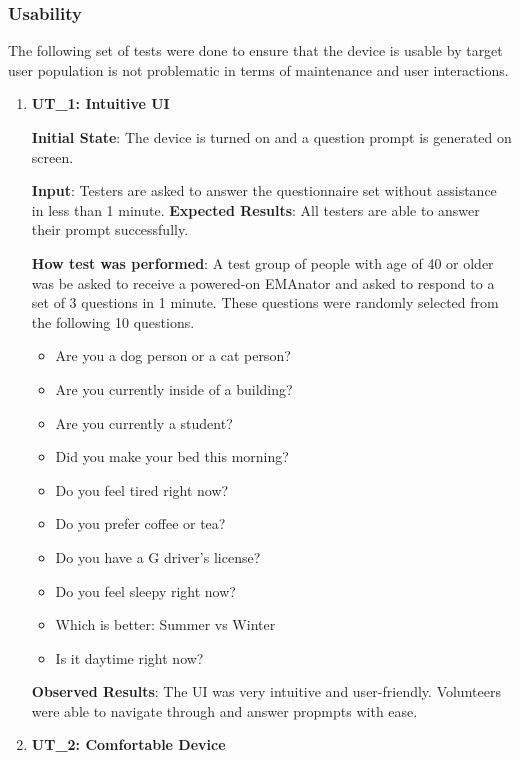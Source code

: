 \documentclass[12pt, titlepage]{article}
\begin{document}
\subsubsection{Usability}
The following set of tests were done to ensure that the device is usable by target user population is not problematic in terms of maintenance and user interactions.
\begin{enumerate}

  \item\textbf{{UT\_1: Intuitive UI\\}}\label{UT1}

  \textbf{Initial State}: The device is turned on and a question prompt is generated on screen.

  \textbf{Input}: Testers are asked to answer the questionnaire set without assistance in less than 1 minute.
  \textbf{Expected Results}: All testers are able to answer their prompt successfully.

  \textbf{How test was performed}: A test group of people with age of 40 or older was be asked to receive a powered-on EMAnator and asked to respond to a set of 3 questions in 1 minute. These questions were randomly selected from the following 10 questions.

  \begin{itemize}
    \item Are you a dog person or a cat person?
    \item Are you currently inside of a building?
    \item Are you currently a student?
    \item Did you make your bed this morning?
    \item Do you feel tired right now?
    \item Do you prefer coffee or tea?
    \item Do you have a G driver's license?
    \item Do you feel sleepy right now?
    \item Which is better: Summer vs Winter
    \item Is it daytime right now?
  \end{itemize}

  \textbf{Observed Results}: The UI was very intuitive and user-friendly. Volunteers were able to navigate through and answer propmpts with ease.

  \item\textbf{{UT\_2: Comfortable Device\\}}\label{UT2}


\end{enumerate}
\end{document}
